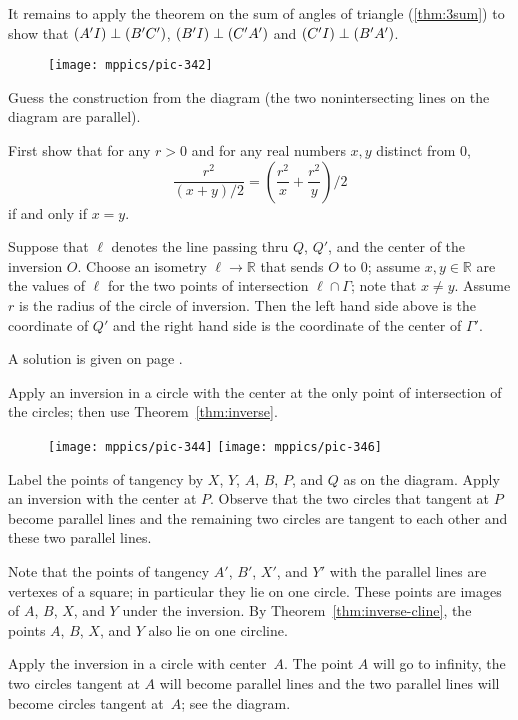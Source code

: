 It remains to apply the theorem on the sum of angles of triangle (\ref{thm:3sum})
to show that $(A'I)\z\perp (B'C')$, 
$(B'I)\z\perp (C'A')$
and
$(C'I)\z\perp (B'A')$.

{

\begin{wrapfigure}{r}{34mm}
\vskip-0mm
\centering
\texttt{[image: mppics/pic-342]}
\end{wrapfigure}

Guess the construction from the diagram (the two nonintersecting lines on the diagram are parallel).

First show that for any $r>0$ and for any real numbers $x,y$ distinct from $0$,
$$\frac{r^2}{(x+y)/2}
=
\left(\frac {r^2}x+\frac {r^2}y\right)/2$$
if and only if $x=y$.

}

Suppose that $\ell$ denotes the line passing thru $Q$, $Q'$, and the center of the inversion $O$.
Choose an isometry $\ell\to\mathbb{R}$ that sends $O$ to $0$;
assume $x,y\in \mathbb{R}$ are the values of $\ell$ for the two points of intersection $\ell\cap\Gamma$;
note that $x\ne y$.
Assume $r$ is the radius of the circle of inversion.
Then the left hand side above is the coordinate of $Q'$ 
and the right hand side is the coordinate of the center of $\Gamma'$.

A solution is given on page \pageref{page:solution-for-ex:circumtool}.

Apply an inversion in a circle with the center at the only point of intersection of the circles;
then use Theorem~\ref{thm:inverse}.

{

\begin{wrapfigure}[15]{r}{55mm}
\vskip-8mm
\centering
\texttt{[image: mppics/pic-344]}
\vskip6mm
\texttt{[image: mppics/pic-346]}
\end{wrapfigure}

Label the points of tangency by $X$, $Y$, $A$, $B$, $P$, and $Q$ as on the diagram.
Apply an inversion with the center at $P$. 
Observe that the two circles that tangent at $P$ become parallel lines and 
the remaining two circles are tangent to each other and these two parallel lines.

Note that the points of tangency $A'$, $B'$, $X'$, and $Y'$ with the parallel lines are vertexes of a square;
in particular they lie on one circle.
These points are images of $A$, $B$, $X$, and $Y$ under the inversion.
By Theorem~\ref{thm:inverse-cline}, the points $A$, $B$, $X$, and $Y$ also lie on one circline.

Apply the inversion in a circle with center~$A$. 
The point $A$ will go to infinity, the two circles tangent at $A$ will become parallel lines
and the two parallel lines will become circles tangent at~$A$; see the diagram.

}

